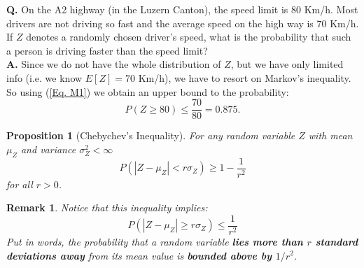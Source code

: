 \documentclass[notes=show,smaller,handout]{beamer}\usepackage[]{graphicx}\usepackage[]{color}
\newtheorem{remark}{Remark}[section]
\newtheorem{proposition}{Proposition}[section]
\renewcommand{\Pr}{P}
\begin{document}
\begin{frame}{\secname}
  \begin{example}
  \begin{footnotesize}
  \textbf{Q.} On the A2 highway (in the Luzern Canton), the speed limit is $80$ Km/h. Most drivers are not driving so fast and the average speed on the high way is $70$ Km/h.
  If $Z$ denotes a randomly chosen driver's speed, what is the probability that such a person is driving faster than the speed limit? \\
  \bigskip
  \pause
  \textbf{A.} Since we do not have the whole distribution of $Z$, but we have only limited info (i.e. we know $E[Z]=70$ Km/h), we have to resort on Markov's inequality. So using (\ref{Eq. M1}) we obtain an upper bound to the probability:
  $$
  P(Z \geq 80) \leq \frac{70}{80} = 0.875.
  $$
  \end{footnotesize}
  \end{example}
\end{frame}

\begin{frame}{\secname}
  \begin{proposition}[Chebychev's Inequality]
For any random variable $Z$ with mean $\mu_Z$ and variance $\sigma_Z^2<\infty$
  \begin{equation*}
  \Pr \left( \left\vert Z-\mu_Z\right\vert <r\sigma_Z\right) \geq 1-\frac{1 }{r^{2}}
  \end{equation*}
  for all $r>0$.
  \end{proposition}
  \pause
  \begin{remark}
  Notice that this inequality implies:
  \begin{equation}
  \Pr \left( \left\vert Z-\mu_Z\right\vert \geq r\sigma_Z\right) \leq \frac{1 }{r^{2}} \label{Eq. C2}
  \end{equation}
 Put in words, the probability that a random variable \textbf{lies more than $r$ standard deviations away} from its mean value is \textbf{bounded above by $1/r^2$}.
  \end{remark}
\end{frame}
\end{document}

